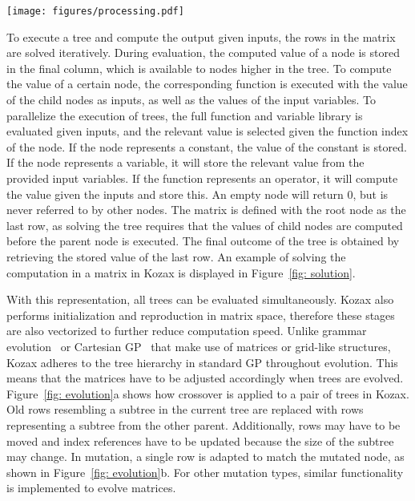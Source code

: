 \documentclass{article}
\begin{document}
\begin{figure*}[!t]
    \centering
    \texttt{[image: figures/processing.pdf]}
    \caption{\textbf{Processing of a matrix in Kozax.} The matrix is iteratively solved with the input values: $y_1 = \frac{\pi}{2}$ and $y_2 = 1$. A blue row in the matrix corresponds to a blue node in the tree, where the computed value of the node is stored in the last column. The final value of the tree is obtained by taking the stored value in the last row.}
    \label{fig: solution}
\end{figure*}

To execute a tree and compute the output given inputs, the rows in the matrix are solved iteratively.  During evaluation, the computed value of a node is stored in the final column, which is available to nodes higher in the tree. To compute the value of a certain node, the corresponding function is executed with the value of the child nodes as inputs, as well as the values of the input variables. To parallelize the execution of trees, the full function and variable library is evaluated given inputs, and the relevant value is selected given the function index of the node. If the node represents a constant, the value of the constant is stored. If the node represents a variable, it will store the relevant value from the provided input variables. If the function represents an operator, it will compute the value given the inputs and store this. An empty node will return 0, but is never referred to by other nodes. The matrix is defined with the root node as the last row, as solving the tree requires that the values of child nodes are computed before the parent node is executed. The final outcome of the tree is obtained by retrieving the stored value of the last row. An example of solving the computation in a matrix in Kozax is displayed in Figure~\ref{fig: solution}.

With this representation, all trees can be evaluated simultaneously. Kozax also performs initialization and reproduction in matrix space, therefore these stages are also vectorized to further reduce computation speed. Unlike grammar evolution~\cite{o2001grammatical} or Cartesian GP~\cite{miller2015cartesian} that make use of matrices or grid-like structures, Kozax adheres to the tree hierarchy in standard GP throughout evolution. This means that the matrices have to be adjusted accordingly when trees are evolved. Figure~\ref{fig: evolution}a shows how crossover is applied to a pair of trees in Kozax. Old rows resembling a subtree in the current tree are replaced with rows representing a subtree from the other parent. Additionally, rows may have to be moved and index references have to be updated because the size of the subtree may change. In mutation, a single row is adapted to match the mutated node, as shown in Figure~\ref{fig: evolution}b. For other mutation types, similar functionality is implemented to evolve matrices.
\end{document}
